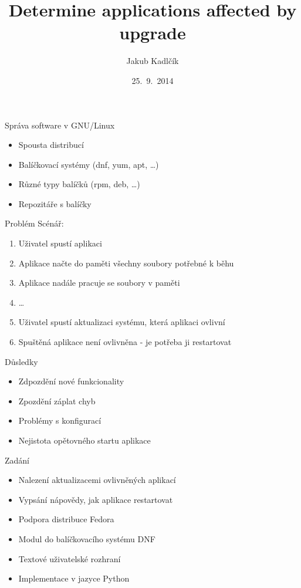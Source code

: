 \documentclass{beamer}
\title[tracer]{Determine applications affected by upgrade}
\author{Jakub Kadlčík}
\institute[UPOL]{Univerzita Palackého v Olomouci}
\date{25.~9.~2014}
\begin{document}
	\begin{frame}
		\titlepage
	\end{frame}

	\begin{frame}{Správa software v GNU/Linux}
		\begin{itemize}
			\item Spousta distribucí
			\item Balíčkovací systémy (dnf, yum, apt, \dots)
			\item Různé typy balíčků (rpm, deb, \dots)
			\item Repozitáře s balíčky
		\end{itemize}
	\end{frame}

	\begin{frame}{Problém}
		Scénář:
		\begin{enumerate}
			\item Uživatel spustí aplikaci
			\item Aplikace načte do paměti všechny soubory potřebné k běhu
			\item Aplikace nadále pracuje se soubory v paměti
			\item \dots
			\item Uživatel spustí aktualizaci systému, která aplikaci ovlivní
			\item Spuštěná aplikace není ovlivněna - je potřeba ji restartovat
		\end{enumerate}
	\end{frame}

	\begin{frame}{Důsledky}
		\begin{itemize}
			\item Zdpozdění nové funkcionality
			\item Zpozdění záplat chyb
			\item Problémy s konfigurací
			\item Nejistota opětovného startu aplikace
		\end{itemize}
	\end{frame}

	\begin{frame}{Zadání}
		\begin{itemize}
			\item Nalezení aktualizacemi ovlivněných aplikací
			\item Vypsání nápovědy, jak aplikace restartovat
		\end{itemize}

		\begin{itemize}
			\item Podpora distribuce Fedora
			\item Modul do balíčkovacího systému DNF
			\item Textové uživatelské rozhraní
			\item Implementace v jazyce Python
		\end{itemize}
	\end{frame}
\end{document}

